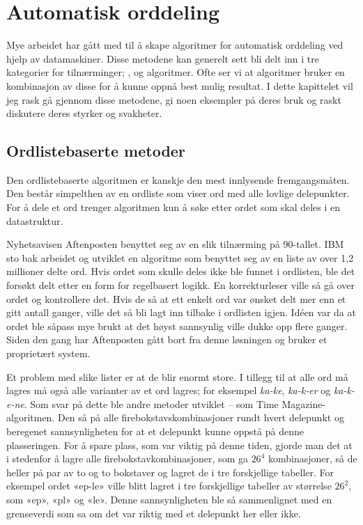 \chapter{Automatisk orddeling}
\label{sec:automatisk-orddeling}

Mye arbeidet har gått med til å skape algoritmer for automatisk orddeling ved hjelp av datamaskiner. Disse metodene kan generelt sett bli delt inn i tre kategorier for tilnærminger; ,  og  algoritmer. Ofte ser vi at algoritmer bruker en kombinasjon av disse for å kunne oppnå best mulig resultat. I dette kapittelet vil jeg rask gå gjennom disse metodene, gi noen eksempler på deres bruk og raskt diskutere deres styrker og svakheter.

\section{Ordlistebaserte metoder}

Den ordlistebaserte algoritmen er kanskje den mest innlysende fremgangsmåten. Den består simpelthen av en ordliste som viser ord med alle lovlige delepunkter. For å dele et ord trenger algoritmen kun å søke etter ordet som skal deles i en datastruktur. 

Nyhetsavisen Aftenposten benyttet seg av en slik tilnærming på 90-tallet. IBM sto bak arbeidet og utviklet en algoritme som benyttet seg av en liste av over 1,2 millioner delte ord. Hvis ordet som skulle deles ikke ble funnet i ordlisten, ble det forsøkt delt etter en form for regelbasert logikk. En korrekturleser ville så gå over ordet og kontrollere det. Hvis de så at ett enkelt ord var ønsket delt mer enn et gitt antall ganger, ville det så bli lagt inn tilbake i ordlisten igjen. Idéen var da at ordet ble såpass mye brukt at det høyst sannsynlig ville dukke opp flere ganger. Siden den gang har Aftenposten gått bort fra denne løsningen og bruker et proprietært system. \cite{thoresen1993virtuelle,eng-aftenposten}

Et problem med slike lister er at de blir enormt store. I tillegg til at alle ord må lagres må også alle varianter av et ord lagres; for eksempel \textit{ka-ke}, \textit{ka-k-er} og \textit{ka-k-e-ne}. Som svar på dette ble andre metoder utviklet -- som Time Magazine-algoritmen. Den så på alle firebokstavskombinasjoner rundt hvert delepunkt og beregenet sannsynligheten for at et delepunkt kunne oppstå på denne plasseringen. For å spare plass, som var viktig på denne tiden, gjorde man det at i stedenfor å lagre alle firebokstavkombinasjoner, som ga $26^4$ kombinasjoner, så de heller på par av to og to bokstaver og lagret de i tre forskjellige tabeller. For eksempel ordet «ep-le» ville blitt lagret i tre forskjellige tabeller av størrelse $26^2$, som «ep», «pl» og «le». Denne sannsynligheten ble så sammenlignet med en grenseverdi som sa om det var riktig med et delepunkt her eller ikke. 

